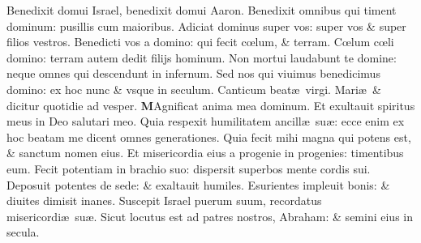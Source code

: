 \documentclass[a5paper,10pt]{book}
\def\leftmarginnote{%
	\lrmarginnote{\hskip -\marginparsep \hskip -6.5em}}
\def\ae{æ}
\def\oe{œ}
\begin{document}
\begin{multicols*}{2}
\newline \color{red} B\color{black}enedixit domui Israel, benedixit domui Aaron.
\newline \color{red} B\color{black}enedixit omnibus qui timent dominum: pusillis cum maioribus.
\newline \color{red} A\color{black}diciat dominus super vos: super vos \& super filios vestros.
\newline \color{red} B\color{black}enedicti vos a domino: qui fecit c\oe lum, \& terram.
\newline \color{red} C\color{black}\oe lum c\oe li domino: terram autem dedit filijs hominum.
\newline \color{red} N\color{black}on mortui laudabunt te domine: neque omnes qui descendunt in infernum.
\newline \color{red} S\color{black}ed nos qui viuimus benedicimus domino: ex hoc nunc \& vsque in seculum.
\newline \color{red} \hypertarget{Magnificat}{Canticum} beat\ae \ virgi. Mari\ae \ \& dicitur quotidie ad vesper. \color{black}
\lettrine[lines=2]{\bfseries \color{red} M}{}Agnificat anima mea dominum.\leftmarginnote{\begin{flushright}Lu.\\1.\end{flushright}}
\newline \linebreak
\noindent \color{red} E\color{black}t exultauit spiritus meus in Deo salutari meo.
\newline \color{red} Q\color{black}uia respexit humilitatem ancill\ae \ su\ae : ecce enim ex hoc beatam me dicent omnes generationes.
\newline \color{red} Q\color{black}uia fecit mihi magna qui potens est, \& sanctum nomen eius.
\newline \color{red} E\color{black}t misericordia eius a progenie in progenies: timentibus eum.
\newline \color{red} F\color{black}ecit potentiam in brachio suo: dispersit superbos mente cordis sui.
\newline \color{red} D\color{black}eposuit potentes de sede: \& exaltauit humiles.
\newline \color{red} E\color{black}surientes impleuit bonis: \& diuites dimisit inanes.
\newline \color{red} S\color{black}uscepit Israel puerum suum, recordatus misericordi\ae \ su\ae .
\newline \color{red} S\color{black}icut locutus est ad patres nostros, Abraham: \& semini eius in secula. 

\end{multicols*}
\end{document}
